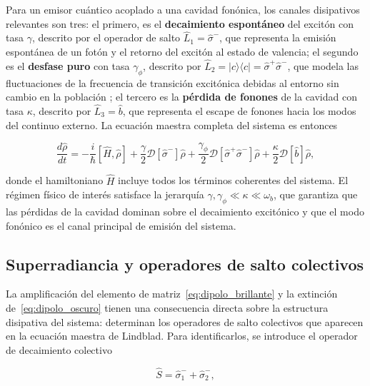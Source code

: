 Para un emisor cuántico acoplado a una cavidad fonónica, los canales disipativos relevantes son tres: el primero, es el \textbf{decaimiento espontáneo} del excitón con tasa $\gamma$, descrito por el operador de salto $\hat{L}_1 = \hat{\sigma}^-$, que representa la emisión espontánea de un fotón y el retorno del excitón al estado de valencia; el segundo es el \textbf{desfase puro} con tasa $\gamma_\phi$, descrito por $\hat{L}_2 = |c\rangle\langle c| = \hat{\sigma}^+\hat{\sigma}^-$, que modela las fluctuaciones de la frecuencia de transición excitónica debidas al entorno sin cambio en la población \cite{breuerpetruccione2002}; el tercero es la \textbf{pérdida de fonones} de la cavidad con tasa $\kappa$, descrito por $\hat{L}_3 = \hat{b}$, que representa el escape de fonones hacia los modos del continuo externo. La ecuación maestra completa del sistema es entonces

\begin{equation}
	\frac{d\hat{\rho}}{dt} = -\frac{i}{\hbar}
	\left[\hat{H},\hat{\rho}\right]
	+ \frac{\gamma}{2}\mathcal{D}[\hat{\sigma}^-]\hat{\rho}
	+ \frac{\gamma_\phi}{2}\mathcal{D}[\hat{\sigma}^+\hat{\sigma}^-]\hat{\rho}
	+ \frac{\kappa}{2}\mathcal{D}[\hat{b}]\hat{\rho},
	\label{eq:lindblad_sistema}
\end{equation}

donde el hamiltoniano $\hat{H}$ incluye todos los términos coherentes del sistema. El régimen físico de interés satisface la jerarquía $\gamma,\gamma_\phi \ll \kappa \ll \omega_b$, que garantiza que las pérdidas de la cavidad dominan sobre el decaimiento excitónico y que el modo fonónico es el canal principal de emisión del sistema.

\subsection{Superradiancia y operadores de salto colectivos}
\label{sec:superradiancia}

La amplificación del elemento de matriz~\eqref{eq:dipolo_brillante} y la extinción de~\eqref{eq:dipolo_oscuro} tienen una consecuencia directa sobre la estructura disipativa del sistema: determinan los operadores de salto colectivos que aparecen en la ecuación maestra de Lindblad. Para identificarlos, se introduce el operador de decaimiento colectivo

\begin{equation}
	\hat{S} = \hat{\sigma}_1^- + \hat{\sigma}_2^-,
	\label{eq:S_colectivo}
\end{equation}


